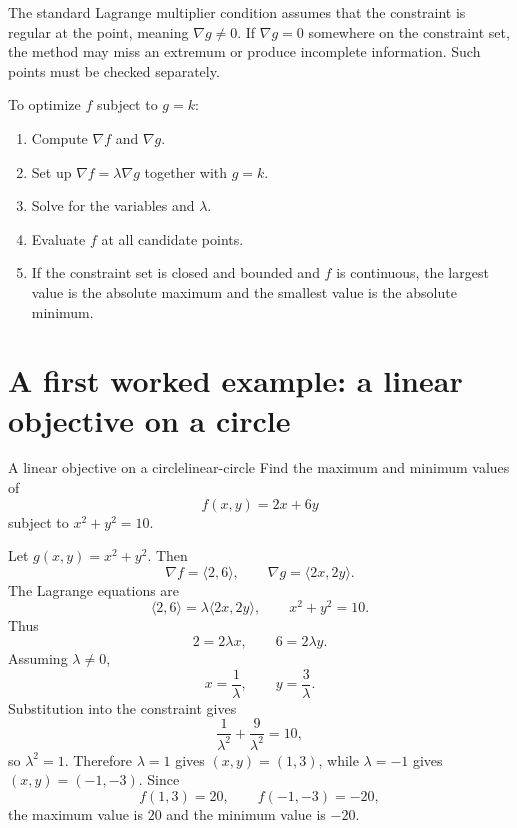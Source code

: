 \documentclass[11pt]{article}
\newcommand{\grad}{\nabla}
\begin{document}
\begin{importantbox}
The standard Lagrange multiplier condition assumes that the constraint is regular at the point, meaning $\grad g\ne 0$. If $\grad g=0$ somewhere on the constraint set, the method may miss an extremum or produce incomplete information. Such points must be checked separately.
\end{importantbox}

\begin{notebox}
To optimize $f$ subject to $g=k$:
\begin{enumerate}
  \item Compute $\grad f$ and $\grad g$.
  \item Set up $\grad f=\lambda \grad g$ together with $g=k$.
  \item Solve for the variables and $\lambda$.
  \item Evaluate $f$ at all candidate points.
  \item If the constraint set is closed and bounded and $f$ is continuous, the largest value is the absolute maximum and the smallest value is the absolute minimum.
\end{enumerate}
\end{notebox}

\section{A first worked example: a linear objective on a circle}

\begin{workedexample}{A linear objective on a circle}{linear-circle}
Find the maximum and minimum values of
\[
f(x,y)=2x+6y
\]
subject to $x^2+y^2=10$.

Let $g(x,y)=x^2+y^2$. Then
\[
\grad f=\langle 2,6\rangle,
\qquad
\grad g=\langle 2x,2y\rangle.
\]
The Lagrange equations are
\[
\langle 2,6\rangle=\lambda\langle 2x,2y\rangle,
\qquad x^2+y^2=10.
\]
Thus
\[
2=2\lambda x,\qquad 6=2\lambda y.
\]
Assuming $\lambda\ne 0$,
\[
x=\frac1\lambda,\qquad y=\frac3\lambda.
\]
Substitution into the constraint gives
\[
\frac{1}{\lambda^2}+\frac{9}{\lambda^2}=10,
\]
so $\lambda^2=1$. Therefore $\lambda=1$ gives $(x,y)=(1,3)$, while $\lambda=-1$ gives $(x,y)=(-1,-3)$. Since
\[
f(1,3)=20,\qquad f(-1,-3)=-20,
\]
the maximum value is $20$ and the minimum value is $-20$.
\end{workedexample}
\end{document}
